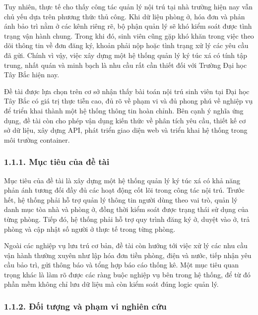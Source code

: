 \documentclass[12pt]{article}
\begin{document}
Tuy nhiên, thực tế cho thấy công tác quản lý nội trú tại nhà trường hiện nay vẫn chủ yếu dựa trên phương thức thủ công. Khi dữ liệu phòng ở, hóa đơn và phản ánh bảo trì nằm ở các kênh riêng rẽ, bộ phận quản lý sẽ khó kiểm soát được tình trạng vận hành chung. Trong khi đó, sinh viên cũng gặp khó khăn trong việc theo dõi thông tin về đơn đăng ký, khoản phải nộp hoặc tình trạng xử lý các yêu cầu đã gửi. Chính vì vậy, việc xây dựng một hệ thống quản lý ký túc xá có tính tập trung, nhất quán và minh bạch là nhu cầu rất cần thiết đối với Trường Đại học Tây Bắc hiện nay.

Đề tài được lựa chọn trên cơ sở nhận thấy bài toán nội trú sinh viên tại Đại học Tây Bắc có giá trị thực tiễn cao, đủ rõ về phạm vi và đủ phong phú về nghiệp vụ để triển khai thành một hệ thống thông tin hoàn chỉnh. Bên cạnh ý nghĩa ứng dụng, đề tài còn cho phép vận dụng kiến thức về phân tích yêu cầu, thiết kế cơ sở dữ liệu, xây dựng API, phát triển giao diện web và triển khai hệ thống trong môi trường container.

\subsubsection*{1.1.1. Mục tiêu của đề tài}

Mục tiêu của đề tài là xây dựng một hệ thống quản lý ký túc xá có khả năng phản ánh tương đối đầy đủ các hoạt động cốt lõi trong công tác nội trú. Trước hết, hệ thống phải hỗ trợ quản lý thông tin người dùng theo vai trò, quản lý danh mục tòa nhà và phòng ở, đồng thời kiểm soát được trạng thái sử dụng của từng phòng. Tiếp đó, hệ thống phải hỗ trợ quy trình đăng ký ở, duyệt vào ở, trả phòng và cập nhật số người ở thực tế trong từng phòng.

Ngoài các nghiệp vụ lưu trú cơ bản, đề tài còn hướng tới việc xử lý các nhu cầu vận hành thường xuyên như lập hóa đơn tiền phòng, điện và nước, tiếp nhận yêu cầu bảo trì, gửi thông báo và tổng hợp báo cáo thống kê. Một mục tiêu quan trọng khác là làm rõ được các ràng buộc nghiệp vụ bên trong hệ thống, để từ đó phần mềm không chỉ lưu dữ liệu mà còn kiểm soát đúng logic quản lý.

\subsubsection*{1.1.2. Đối tượng và phạm vi nghiên cứu}
\end{document}

